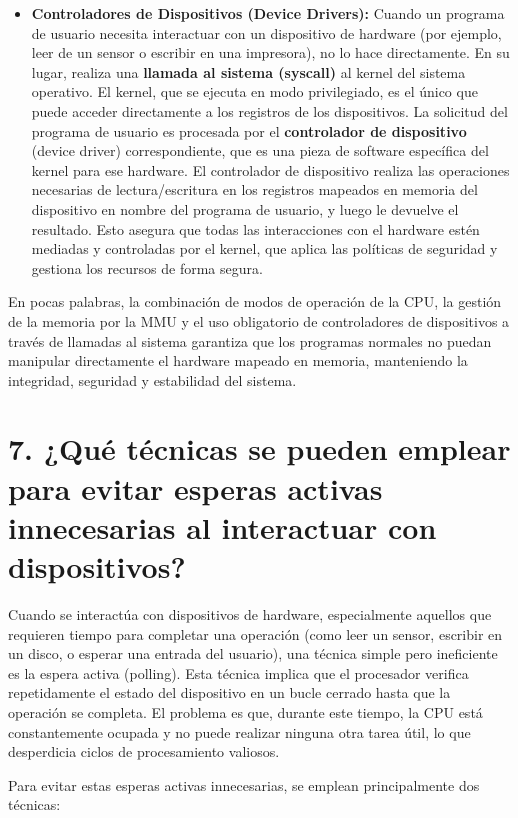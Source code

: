 \documentclass[12pt, a4paper]{article}
\begin{document}
\begin{itemize}
    \item \textbf{Controladores de Dispositivos (Device Drivers):}
    Cuando un programa de usuario necesita interactuar con un dispositivo de hardware (por ejemplo, leer de un sensor o escribir en una impresora), no lo hace directamente. En su lugar, realiza una \textbf{llamada al sistema (syscall)} al kernel del sistema operativo. El kernel, que se ejecuta en modo privilegiado, es el único que puede acceder directamente a los registros de los dispositivos. La solicitud del programa de usuario es procesada por el \textbf{controlador de dispositivo} (device driver) correspondiente, que es una pieza de software específica del kernel para ese hardware. El controlador de dispositivo realiza las operaciones necesarias de lectura/escritura en los registros mapeados en memoria del dispositivo en nombre del programa de usuario, y luego le devuelve el resultado. Esto asegura que todas las interacciones con el hardware estén mediadas y controladas por el kernel, que aplica las políticas de seguridad y gestiona los recursos de forma segura.
\end{itemize}
En pocas palabras, la combinación de modos de operación de la CPU, la gestión de la memoria por la MMU y el uso obligatorio de controladores de dispositivos a través de llamadas al sistema garantiza que los programas normales no puedan manipular directamente el hardware mapeado en memoria, manteniendo la integridad, seguridad y estabilidad del sistema.

\section*{7. ¿Qué técnicas se pueden emplear para evitar esperas activas innecesarias al interactuar con dispositivos?}
Cuando se interactúa con dispositivos de hardware, especialmente aquellos que requieren tiempo para completar una operación (como leer un sensor, escribir en un disco, o esperar una entrada del usuario), una técnica simple pero ineficiente es la espera activa (polling). Esta técnica implica que el procesador verifica repetidamente el estado del dispositivo en un bucle cerrado hasta que la operación se completa. El problema es que, durante este tiempo, la CPU está constantemente ocupada y no puede realizar ninguna otra tarea útil, lo que desperdicia ciclos de procesamiento valiosos.

Para evitar estas esperas activas innecesarias, se emplean principalmente dos técnicas:
\end{document}
